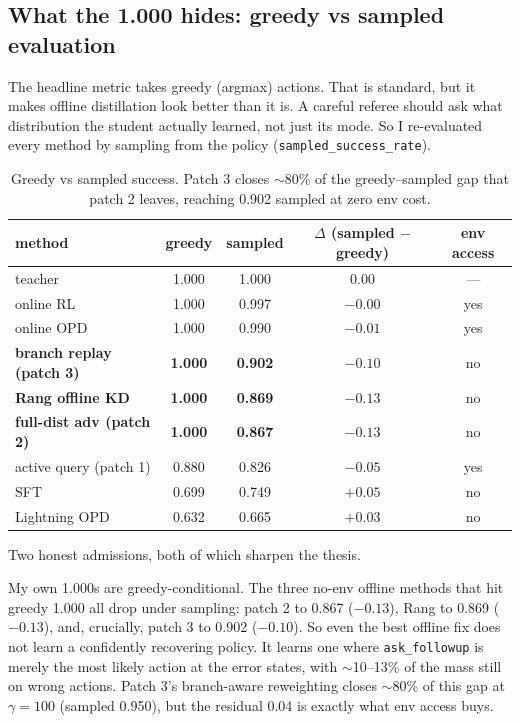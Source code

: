 \documentclass[11pt]{article}
\newcommand{\code}[1]{\texttt{#1}}
\begin{document}
\subsection{What the 1.000 hides: greedy vs sampled evaluation}
\label{sec:greedy}

The headline metric takes greedy (argmax) actions. That is standard, but it
makes offline distillation look better than it is. A careful referee should ask what distribution the
student actually learned, not just its mode. So I re-evaluated every method by
sampling from the policy (\code{sampled\_success\_rate}).

\begin{table}[h]
\centering
\small
\begin{tabular}{l c c c c}
\toprule
\textbf{method} & \textbf{greedy} & \textbf{sampled} & \textbf{$\Delta$ (sampled $-$ greedy)} & \textbf{env access} \\
\midrule
teacher       & 1.000 & 1.000 & $0.00$  & --- \\
online RL     & 1.000 & 0.997 & $-0.00$ & yes \\
online OPD    & 1.000 & 0.990 & $-0.01$ & yes \\
\textbf{branch replay (patch 3)} & \textbf{1.000} & \textbf{0.902} & $\mathbf{-0.10}$ & no \\
\textbf{Rang offline KD} & \textbf{1.000} & \textbf{0.869} & $\mathbf{-0.13}$ & no \\
\textbf{full-dist adv (patch 2)} & \textbf{1.000} & \textbf{0.867} & $\mathbf{-0.13}$ & no \\
active query (patch 1) & 0.880 & 0.826 & $-0.05$ & yes \\
SFT           & 0.699 & 0.749 & $+0.05$ & no \\
Lightning OPD & 0.632 & 0.665 & $+0.03$ & no \\
\bottomrule
\end{tabular}
\caption{Greedy vs sampled success. Patch 3 closes $\sim$80\% of the greedy--sampled
gap that patch 2 leaves, reaching 0.902 sampled at zero env cost.}
\label{tab:greedy}
\end{table}

Two honest admissions, both of which sharpen the thesis.

My own 1.000s are greedy-conditional. The three no-env offline methods
that hit greedy 1.000 all drop under sampling: patch 2 to 0.867 ($-0.13$), Rang to
0.869 ($-0.13$), and, crucially, patch 3 to 0.902 ($-0.10$). So even the best
offline fix does not learn a confidently recovering policy. It learns one where
\code{ask\_followup} is merely the most likely action at the error states, with
$\sim$10--13\% of the mass still on wrong actions. Patch 3's branch-aware reweighting
closes $\sim$80\% of this gap at $\gamma=100$ (sampled 0.950), but the residual 0.04
is exactly what env access buys.
\end{document}
